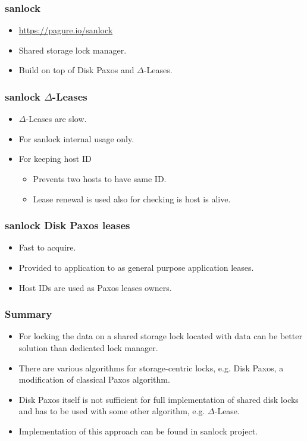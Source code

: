 \documentclass[10pt,utf8]{beamer}
\begin{document}
\begin{frame}
    \frametitle{sanlock}
    \begin{itemize}
     \item \color{blue}\url{https://pagure.io/sanlock}\color{black}
     \item Shared storage lock manager.
     \item Build on top of Disk Paxos and $\Delta$-Leases.
    \end{itemize}
\end{frame}

\begin{frame}
    \frametitle{sanlock $\Delta$-Leases}
    \begin{itemize}
     \item $\Delta$-Leases are slow.
     \item For sanlock internal usage only.
     \item For keeping host ID
     \begin{itemize}
        \item Prevents two hosts to have same ID.
        \item Lease renewal is used also for checking is host is alive.
     \end{itemize}
    \end{itemize}
\end{frame}

\begin{frame}
    \frametitle{sanlock Disk Paxos leases}
    \begin{itemize}
     \item Fast to acquire.
     \item Provided to application to as general purpose application leases.
     \item Host IDs are used as Paxos leases owners.
    \end{itemize}
\end{frame}

\begin{frame}
    \frametitle{Summary}
    \begin{itemize}
     \item For locking the data on a shared storage lock located with data can be better solution than dedicated lock manager.
     \item There are various algorithms for storage-centric locks, e.g. Disk Paxos, a modification of classical Paxos algorithm.
     \item Disk Paxos itself is not sufficient for full implementation of shared disk locks and has to be used with some other algorithm, e.g. $\Delta$-Lease.
     \item Implementation of this approach can be found in sanlock project.
    \end{itemize}
\end{frame}
\end{document}
